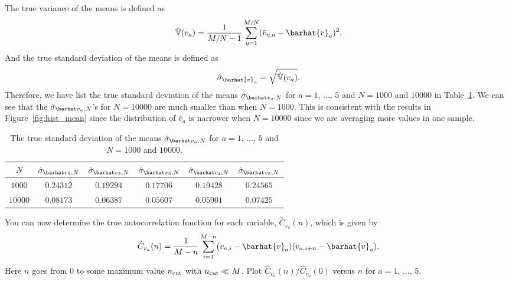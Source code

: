 The true variance of the means is defined as
%
\begin{equation}
    \hat{\mathbb{V}}(v_a) = \frac{ 1 }{ M/N - 1 }
    \sum_{\eta=1}^{M/N} (\bar{v}_{\eta,a} - \barhat{v}_a)^2.
\end{equation}
%
And the true standard deviation of the means is defined as
%
\begin{equation}
    \hat{\sigma}_{\barhat{v}_a} = \sqrt{\hat{\mathbb{V}}(v_a)}.
\end{equation}
%
Therefore, we have list the true standard deviation of the means
\(\sgbar{a}\) for \(a = 1\), \(\ldots\), \(5\) and \(N = 1000\) and \(10000\)
in Table~\ref{tab:truestd}.
We can see that the \(\sgbar{a}\)'s for \(N = 10000\) are much smaller than
when \(N = 1000\). This is consistent with the results in Figure~\ref{fig:hist_mean}
since the distribution of \(\bar{v}_a\) is narrower when \(N = 10000\) since
we are averaging more values in one sample.

\begin{table}[H]
    \centering
    \caption{The true standard deviation of the means
        \(\sgbar{a}\) for \(a = 1\), \(\ldots\), \(5\) and \(N = 1000\) and \(10000\).}
    \label{tab:truestd}
    \begin{tabular}{@{}cccccc@{}}
        \toprule
        \(N\)     & \(\sgbar{1}\) & \(\sgbar{2}\) & \(\sgbar{3}\) & \(\sgbar{4}\) & \(\sgbar{5}\) \\
        \midrule
        \(1000\)  & \(0.24312\)   & \(0.19294\)   & \(0.17706\)   & \(0.19428\)   & \(0.24565\)   \\
        \(10000\) & \(0.08173\)   & \(0.06387\)   & \(0.05607\)   & \(0.05901\)   & \(0.07425\)   \\
        \bottomrule
    \end{tabular}
\end{table}

\Question{} You can now determine the true autocorrelation function for each variable,
\(\hat{C}_{v_a}(n)\), which is given by
%
\begin{equation}
    \hat{C}_{v_a}(n) = \frac{ 1 }{ M - n }
    \sum_{i=1}^{M-n} (v_{a,i} - \barhat{v}_a) (v_{a,i + n} - \barhat{v}_a).
\end{equation}
%
Here \(n\) goes from \(0\) to some maximum value \(n_\textnormal{cut}\) with
\(n_\textnormal{cut} \ll M\).
Plot \(\hat{C}_{v_a}(n) / \hat{C}_{v_a}(0)\) versus \(n\) for \(a = 1\), \(\ldots\), \(5\).

